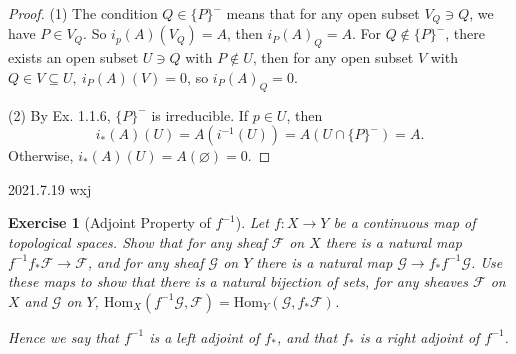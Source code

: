 \documentclass{amsart}
\newtheorem{exe}{Exercise}[subsection]
\begin{document}
\begin{proof}
	(1) The condition $Q\in \{P\}^-$ means that for any open subset $V_Q\ni Q$, we have $P\in V_Q$. So $i_p(A)(V_Q)=A$, then $i_P(A)_Q=A$. For $Q\notin \{P\}^-$, there exists an open subset $U\ni Q$ with $P\notin U$, then for any open subset $V$ with $Q\in V\subseteq U,\ i_P(A)(V)=0$, so $i_P(A)_Q=0$.
	
	
	(2) By Ex. 1.1.6, $\{P\}^-$ is irreducible. If $p\in U$, then $$i_*(A)(U)=A(i^{-1}(U))=A(U\cap \{P\}^-)=A.$$ Otherwise, $i_*(A)(U)=A(\varnothing)=0$.
\end{proof}

2021.7.19 wxj

\begin{exe}[Adjoint Property of $f^{-1}$]
	\label{2.1.18}
   Let $f: X \rightarrow Y$ be a continuous map of topological spaces. Show that for any sheaf $\mathscr{F}$ on $X$ there is a natural map $f^{-1}f_{*}\mathscr{F} \rightarrow \mathscr{F}$, and for any sheaf $\mathscr{G}$ on $Y$ there is a natural map $\mathscr{G} \rightarrow f_{*}f^{-1}\mathscr{G}$. Use these maps to show that there is a natural bijection of sets, for any sheaves $\mathscr{F}$ on $X$ and $\mathscr{G}$ on $Y$, $\mathrm{Hom}_{X}(f^{-1}\mathscr{G}, \mathscr{F}) = \mathrm{Hom}_{Y}(\mathscr{G}, f_{*}\mathscr{F})$.
   
   Hence we say that $f^{-1}$ is a left adjoint of $f_{*}$, and that $f_{*}$ is a right adjoint of $f^{-1}$.
\end{exe}
\end{document}
